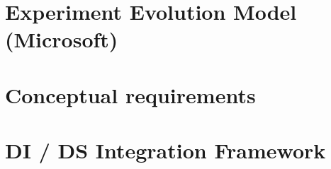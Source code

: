 
\section{Experiment Evolution Model (Microsoft)}
\section{Conceptual requirements}
\section{DI / DS Integration Framework}
